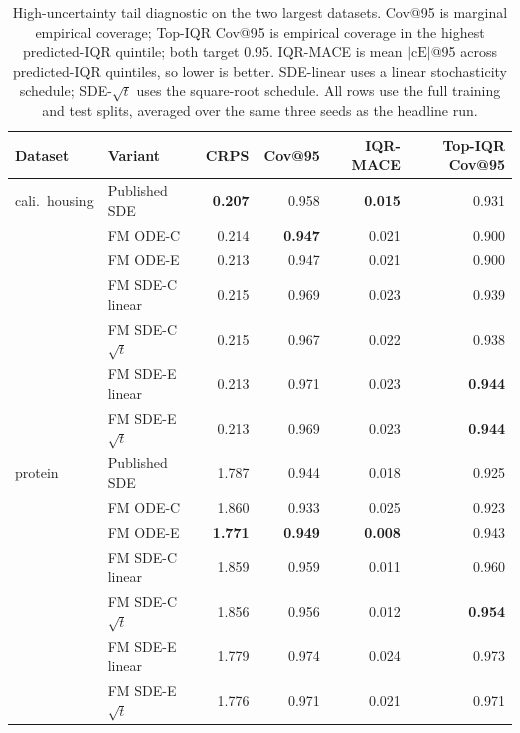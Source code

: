 \documentclass{uai2026}
\begin{document}
\begin{table}[!h]
  \centering
  \caption{High-uncertainty tail diagnostic on the two largest datasets. Cov@95 is marginal empirical coverage; Top-IQR Cov@95 is empirical coverage in the highest predicted-IQR quintile; both target 0.95. IQR-MACE is mean $|\text{cE}|$@95 across predicted-IQR quintiles, so lower is better. SDE-linear uses a linear stochasticity schedule; SDE-$\sqrt{t}$ uses the square-root schedule. All rows use the full training and test splits, averaged over the same three seeds as the headline run.}\label{tab:tail-diagnostic}
  \scriptsize
  \begin{tabular}{llrrrr}
    \toprule
    Dataset & Variant & CRPS & Cov@95 & IQR-MACE & Top-IQR Cov@95 \\
    \midrule
    cali.\ housing & Published SDE            & \textbf{0.207} & 0.958 & \textbf{0.015} & 0.931 \\
                   & FM ODE-C                 & 0.214 & \textbf{0.947} & 0.021 & 0.900 \\
                   & FM ODE-E                 & 0.213 & 0.947 & 0.021 & 0.900 \\
                   & FM SDE-C linear          & 0.215 & 0.969 & 0.023 & 0.939 \\
                   & FM SDE-C $\sqrt{t}$      & 0.215 & 0.967 & 0.022 & 0.938 \\
                   & FM SDE-E linear          & 0.213 & 0.971 & 0.023 & \textbf{0.944} \\
                   & FM SDE-E $\sqrt{t}$      & 0.213 & 0.969 & 0.023 & \textbf{0.944} \\
    protein        & Published SDE            & 1.787 & 0.944 & 0.018 & 0.925 \\
                   & FM ODE-C                 & 1.860 & 0.933 & 0.025 & 0.923 \\
                   & FM ODE-E                 & \textbf{1.771} & \textbf{0.949} & \textbf{0.008} & 0.943 \\
                   & FM SDE-C linear          & 1.859 & 0.959 & 0.011 & 0.960 \\
                   & FM SDE-C $\sqrt{t}$      & 1.856 & 0.956 & 0.012 & \textbf{0.954} \\
                   & FM SDE-E linear          & 1.779 & 0.974 & 0.024 & 0.973 \\
                   & FM SDE-E $\sqrt{t}$      & 1.776 & 0.971 & 0.021 & 0.971 \\
    \bottomrule
  \end{tabular}
\end{table}
\end{document}
